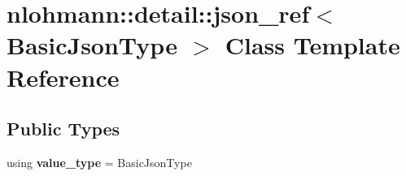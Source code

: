 \hypertarget{classnlohmann_1_1detail_1_1json__ref}{}\section{nlohmann\+:\+:detail\+:\+:json\+\_\+ref$<$ Basic\+Json\+Type $>$ Class Template Reference}
\label{classnlohmann_1_1detail_1_1json__ref}
\subsection*{Public Types}
\begin{DoxyCompactItemize}
\item 
\mbox{\label{classnlohmann_1_1detail_1_1json__ref_a78d76cf288141049568c0d670ed670ef}} 
using {\bfseries value\+\_\+type} = Basic\+Json\+Type
\end{DoxyCompactItemize}
